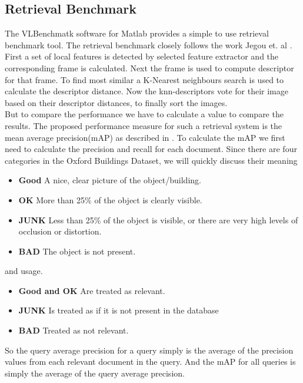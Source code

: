 \documentclass[10pt,a4paper,twocolumn]{article}
\begin{document}
\subsection{Retrieval Benchmark}
The VLBenchmatk software for Matlab provides a simple to use retrieval benchmark tool. The retrieval benchmark closely follows the work Jegou et. al \cite{inria}. First a set of local features is detected by selected feature extractor and the corresponding  frame is calculated. Next the frame is used to compute descriptor for that frame. To find most similar a K-Nearest neighbours search is used to calculate the descriptor distance. Now the knn-descriptors vote for their image based on their descriptor distances, to finally sort the images.\\
But to compare the performance we have to calculate a value to compare the results. The proposed performance measure for such a retrieval system is the mean average precision(mAP) as described in \cite{philbin}. To calculate the mAP we first need to calculate the precision and recall for each document. Since there are four categories in the Oxford Buildings Dataset, we will quickly discuss their meaning
\begin{itemize}
	\item \textbf{Good}  A nice, clear picture of the object/building.
	\item \textbf{OK} More than 25\% of the object is clearly visible. 
	\item \textbf{JUNK} Less than 25\% of the object is visible, or there are very high levels of occlusion or distortion. 
	\item \textbf{BAD} The object is not present. 
\end{itemize}
and usage.
\begin{itemize}
	\item \textbf{Good and OK} Are treated as relevant.
	\item \textbf{JUNK} Is treated as if it is not present in the database
	\item \textbf{BAD} Treated as not relevant.
\end{itemize}
So the query average precision for a query simply is the average of the precision values from each relevant document in the query. And the mAP for all queries is simply the average of the query average precision.
\end{document}
